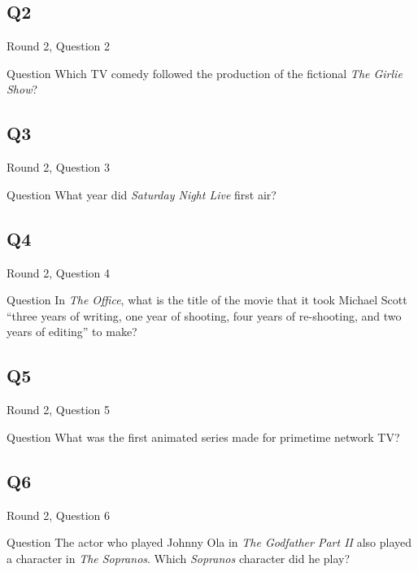 \documentclass[11pt]{beamer}
\begin{document}
\subsection*{Q2}
\begin{frame}[t]{Round 2, Question 2}
\begin{block}{Question}
Which TV comedy followed the production of the fictional \emph{The Girlie Show}?
\end{block}
\end{frame}
\subsection*{Q3}
\begin{frame}[t]{Round 2, Question 3}
\begin{block}{Question}
What year did \emph{Saturday Night Live} first air?
\end{block}
\end{frame}
\subsection*{Q4}
\begin{frame}[t]{Round 2, Question 4}
\begin{block}{Question}
In \emph{The Office}, what is the title of the movie that it took Michael Scott ``three years of writing, one year of shooting, four years of re-shooting, and two years of editing'' to make?
\end{block}
\end{frame}
\subsection*{Q5}
\begin{frame}[t]{Round 2, Question 5}
\begin{block}{Question}
What was the first animated series made for primetime network TV\@?
\end{block}
\end{frame}
\subsection*{Q6}
\begin{frame}[t]{Round 2, Question 6}
\begin{block}{Question}
The actor who played Johnny Ola in \emph{The Godfather Part II} also played a character in \emph{The Sopranos}. Which \emph{Sopranos} character did he play?
\end{block}
\end{frame}
\end{document}
